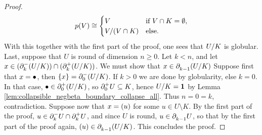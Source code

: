 \begin{proof}
    \begin{equation*}
        p(V) \cong
        \begin{cases}
            V & \text{if } V \cap K = \emptyset, \\
            \coll{(V \cap K)}{V} & \text{else}.
        \end{cases}
    \end{equation*}
    With this together with the first part of the proof, one sees that \( \coll{K}{U} \) is globular.
    Last, suppose that \( U \) is round of dimension \( n \geq 0 \).
    Let \( k < n \), and let \( x \in (\bd{k}{-} (\coll{K}{U})) \cap (\bd{k}{+} (\coll{K}{U})) \).
    We must show that \( x \in \bd{k - 1}{}  (\coll{K}{U}) \)
    Suppose first that \( x = \zcoll \), then \( \set{x} = \bd{0}{-} (\coll{K}{U}) \).
    If \( k > 0 \) we are done by globularity, else \( k = 0 \).
    In that case, \( \zcoll \in \bd{0}{+} (\coll{K}{U}) \), so \( \bd{0}{+} U \subseteq K \), hence \( \coll{K}{U} = \pt \) by Lemma \ref{lem:collapsible_negbeta_boundary_collapse_all}.
    Thus \( n = 0 = k \), contradiction.
    Suppose now that \( x = \icoll{u} \) for some \( u \in U \setminus K \).
    By the first part of the proof, \( u \in \bd{k}{-} U \cap \bd{k}{+} U \), and since \( U \) is round, \( u \in \bd{k - 1}{} U \), so that by the first part of the proof again, \( \icoll{u} \in \bd{k - 1}{} (\coll{K}{U}) \).
    This concludes the proof.
\end{proof}

